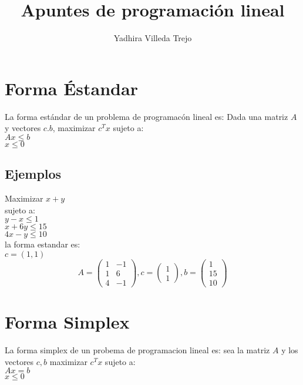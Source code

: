 \documentclass{article}
\title{Apuntes de programaci\'on lineal}
\author{Yadhira Villeda Trejo}
\begin{document}
\maketitle
\section{Forma Éstandar}
La forma estándar de un problema de programacón lineal es:
Dada una matriz $A$ y vectores $c.b$, maximizar $c^Tx$ sujeto a:\\  
$Ax\leq b$ \\
$x\leq 0$

\subsection{Ejemplos}
\label{sec:ejemplos}

Maximizar $x+y$ \\
sujeto a:\\
$y-x\leq 1$ \\
$x+6y\leq 15$ \\
$4x-y\leq 10$ \\
la forma estandar es:\\

$c=(1,1)$
\begin{equation}
  \label{eq:1}
  A=\begin{pmatrix}
    1&-1\\
    1&6 \\
    4&-1
  \end{pmatrix},
  c= \begin{pmatrix}
    1\\
    1
  \end{pmatrix}, b=
  \begin{pmatrix}
    1\\
    15\\
    10
  \end{pmatrix}


\end{equation}
\section{Forma Simplex}
La forma simplex de un probema de programacion lineal es: sea la
matriz $A$ y los vectores $c,b$ maximizar $c^Tx$
sujeto a:\\
$Ax=b$ \\
$x\leq 0$
\end{document}
